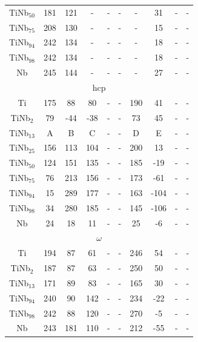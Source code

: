 \begin{longtable}[H]{ c c c c c c c c c c }
	TiNb$_{50}$ & 181 & 121 & - & - & - & - & 31 & - & - \\
	TiNb$_{75}$ & 208 & 130 & - & - & - & - & 15 & - & - \\
	TiNb$_{94}$ & 242 & 134 & - & - & - & - & 18 & - & - \\
	TiNb$_{98}$ & 242 & 134 & - & - & - & - & 18 & - & - \\
	Nb & 245 & 144 & - & - & - & - & 27 & - & - \\
	\hline
	\multicolumn{10}{c}{hcp}\\
	\hline
	Ti & 175 & 88 & 80 & - & - & 190 & 41 & - & - \\		
	TiNb$_{2}$ & 79 & -44 & -38 & - & - & 73 & 45 & - & - \\
	TiNb$_{13}$ & A & B & C & - & - & D & E & - & - \\
	TiNb$_{25}$ & 156 & 113 & 104 & - & - & 200 & 13 & - & - \\
	TiNb$_{50}$ & 124 & 151 & 135 & - & - & 185 & -19 & - & - \\
	TiNb$_{75}$ & 76 & 213 & 156 & - & - & 173 & -61 & - & - \\
	TiNb$_{94}$ & 15 & 289 & 177 & - & - & 163 & -104 & - & - \\
	TiNb$_{98}$ & 34 & 280 & 185 & - & - & 145 & -106 & - & - \\
	Nb & 24 & 18 & 11 & - & - & 25 & -6 & - & - \\
	\hline
	\multicolumn{10}{c}{$\omega$}\\
	Ti & 194 & 87 & 61 & - & - & 246 & 54 & - & - \\
	TiNb$_{2}$ & 187 & 87 & 63 & - & - & 250 & 50 & - & - \\
	TiNb$_{13}$ & 171 & 89 & 83 & - & - & 165 & 30 & - & - \\
	TiNb$_{94}$ & 240 & 90 & 142 & - & - & 234 & -22 & - & - \\
	TiNb$_{98}$ & 242 & 88 & 120 & - & - & 270 & -5 & - & - \\
	Nb & 243 & 181 & 110 & - & - & 212 & -55 & - & - \\
	\hline
\end{longtable}

